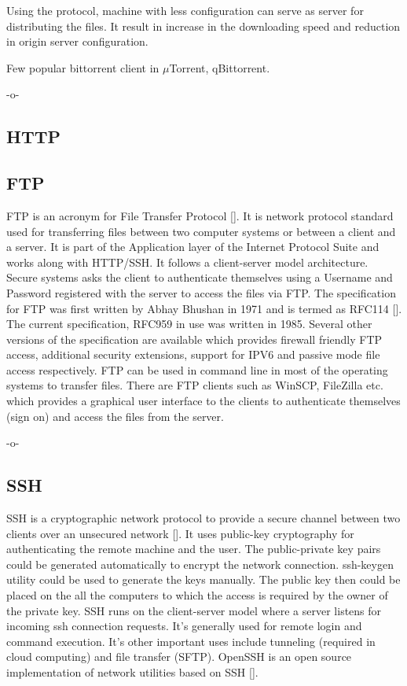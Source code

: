 Using the protocol, machine with less configuration can serve as
server for distributing the files. It result in increase in the
downloading speed and reduction in origin server configuration.

Few popular bittorrent client in $\mu$Torrent, qBittorrent.

     -o-

\subsection{HTTP}
\subsection{FTP }

FTP is an acronym for File Transfer Protocol [\cite{www-ftp-wiki}]. It
is network protocol standard used for transferring files between two
computer systems or between a client and a server. It is part of the
Application layer of the Internet Protocol Suite and works along with
HTTP/SSH. It follows a client-server model architecture. Secure
systems asks the client to authenticate themselves using a Username
and Password registered with the server to access the files via
FTP. The specification for FTP was first written by Abhay Bhushan in
1971 and is termed as RFC114 [\cite{www-rfc114}]. The current
specification, RFC959 in use was written in 1985. Several other
versions of the specification are available which provides firewall
friendly FTP access, additional security extensions, support for IPV6
and passive mode file access respectively. FTP can be used in command
line in most of the operating systems to transfer files. There are FTP
clients such as WinSCP, FileZilla etc. which provides a graphical user
interface to the clients to authenticate themselves (sign on) and
access the files from the server.

     -o-
     
\subsection{SSH}

SSH is a cryptographic network protocol to provide a secure channel
between two clients over an unsecured network [\cite{www-ssh-wiki}]. It
uses public-key cryptography for authenticating the remote machine and
the user. The public-private key pairs could be generated
automatically to encrypt the network connection.  ssh-keygen utility
could be used to generate the keys manually.  The public key then
could be placed on the all the computers to which the access is
required by the owner of the private key.  SSH runs on the
client-server model where a server listens for incoming ssh connection
requests. It's generally used for remote login and command
execution. It's other important uses include tunneling (required in
cloud computing) and file transfer (SFTP).  OpenSSH is an open source
implementation of network utilities based on
SSH [\cite{www-openssh-wiki}].

